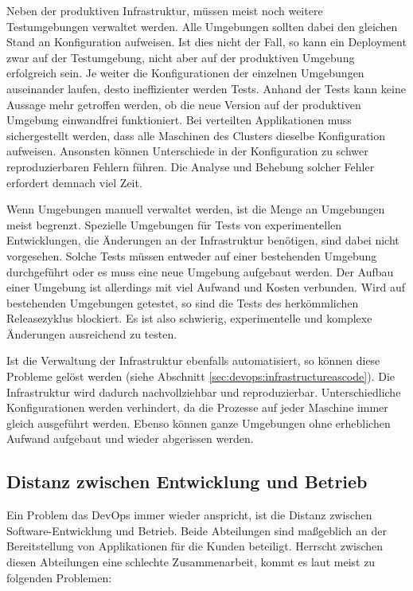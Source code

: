Neben der produktiven Infrastruktur, müssen meist noch weitere Testumgebungen verwaltet werden. Alle Umgebungen sollten dabei den gleichen Stand an Konfiguration aufweisen. Ist dies nicht der Fall, so kann ein Deployment zwar auf der Testumgebung, nicht aber auf der produktiven Umgebung erfolgreich sein. Je weiter die Konfigurationen der einzelnen Umgebungen auseinander laufen, desto ineffizienter werden Tests. Anhand der Tests kann keine Aussage mehr getroffen werden, ob die neue Version auf der produktiven Umgebung einwandfrei funktioniert. Bei verteilten Applikationen muss sichergestellt werden, dass alle Maschinen des Clusters dieselbe Konfiguration aufweisen. Ansonsten können Unterschiede in der Konfiguration zu schwer reproduzierbaren Fehlern führen. Die Analyse und Behebung solcher Fehler erfordert demnach viel Zeit.

Wenn Umgebungen manuell verwaltet werden, ist die Menge an Umgebungen meist begrenzt. Spezielle Umgebungen für Tests von experimentellen Entwicklungen, die Änderungen an der Infrastruktur benötigen, sind dabei nicht vorgesehen.  Solche Tests müssen entweder auf einer bestehenden Umgebung durchgeführt oder es muss eine neue Umgebung aufgebaut werden. Der Aufbau einer Umgebung ist allerdings mit viel Aufwand und Kosten verbunden. Wird auf bestehenden Umgebungen getestet, so sind die Tests des herkömmlichen Releasezyklus blockiert. Es ist also schwierig, experimentelle und komplexe Änderungen ausreichend zu testen.

Ist die Verwaltung der Infrastruktur ebenfalls automatisiert, so können diese Probleme gelöst werden (siehe Abschnitt \ref{sec:devops:infrastructureascode}). Die Infrastruktur wird dadurch nachvollziehbar und reproduzierbar. Unterschiedliche Konfigurationen werden verhindert, da die Prozesse auf jeder Maschine immer gleich ausgeführt werden. Ebenso können ganze Umgebungen ohne erheblichen Aufwand aufgebaut und wieder abgerissen werden.

\subsection{Distanz zwischen Entwicklung und Betrieb}
\label{sec:problem:kluft}
Ein Problem das DevOps immer wieder anspricht, ist die Distanz zwischen Software-Entwicklung und Betrieb. Beide Abteilungen sind maßgeblich an der Bereitstellung von Applikationen für die Kunden beteiligt. Herrscht zwischen diesen Abteilungen eine schlechte Zusammenarbeit, kommt es laut \cite{peschlow2012} meist zu folgenden Problemen:


